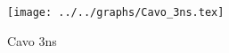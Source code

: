 \begin{figure}[h] \centering \texttt{[image: ../../graphs/Cavo\_3ns.tex]}\caption{Cavo 3ns}\label{gr:Cavo_3ns} \end{figure}
